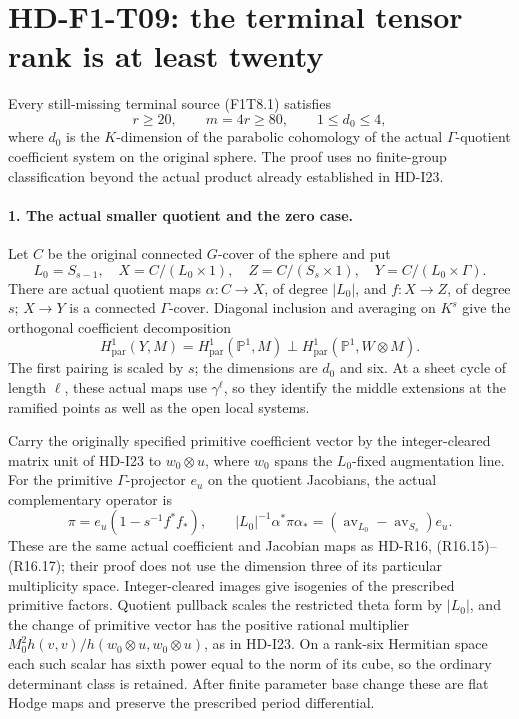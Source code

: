 \section{HD-F1-T09: the terminal tensor rank is at least twenty}
\label{sec:f1-terminal-tensor-budget}

Every still-missing terminal source (F1T8.1) satisfies
\[
                r\ge20,\qquad m=4r\ge80,\qquad
                         1\le d_0\le4,
 \tag{F1T9.1}
\]
where \(d_0\) is the \(K\)-dimension of the parabolic cohomology
of the actual \(\Gamma\)-quotient coefficient system on the
original sphere. The proof uses no finite-group classification
beyond the actual product already established in HD-I23.

\paragraph{1. The actual smaller quotient and the zero case.}
Let \(C\) be the original connected \(G\)-cover of the sphere and
put
\[
 L_0=S_{s-1},\quad X=C/(L_0\times1),\quad Z=C/(S_s\times1),
 \quad Y=C/(L_0\times\Gamma).
 \tag{F1T9.2}
\]
There are actual quotient maps \(\alpha:C\to X\), of degree
\(|L_0|\), and \(f:X\to Z\), of degree \(s\);
\(X\to Y\) is a connected
\(\Gamma\)-cover. Diagonal inclusion and averaging on \(K^s\)
give the orthogonal coefficient decomposition
\[
 H^1_{\mathrm{par}}(Y,M)=
 H^1_{\mathrm{par}}(\mathbb P^1,M)\mathbin{\perp}
 H^1_{\mathrm{par}}(\mathbb P^1,W\otimes M).
 \tag{F1T9.3}
\]
The first pairing is scaled by \(s\); the dimensions are \(d_0\)
and six. At a sheet cycle of length \(\ell\), these actual maps
use \(\gamma^\ell\), so they identify the middle extensions at
the ramified points as well as the open local systems.

Carry the originally specified primitive coefficient vector by
the integer-cleared matrix unit of HD-I23 to \(w_0\otimes u\),
where \(w_0\) spans the \(L_0\)-fixed augmentation line. For the
primitive \(\Gamma\)-projector \(e_u\) on the quotient Jacobians,
the actual complementary operator is
\[
 \pi=e_u(1-s^{-1}f^*f_*),\qquad
 |L_0|^{-1}\alpha^*\pi\alpha_*
       =(\operatorname{av}_{L_0}-\operatorname{av}_{S_s})e_u.
 \tag{F1T9.4}
\]
These are the same actual coefficient and Jacobian maps as
HD-R16, (R16.15)--(R16.17); their proof does not use the
dimension three of its particular multiplicity space.
Integer-cleared images give isogenies of the prescribed
primitive factors. Quotient pullback scales the restricted
theta form by \(|L_0|\), and the change of primitive vector
has the positive rational multiplier
\(M_0^2h(v,v)/h(w_0\otimes u,w_0\otimes u)\), as in HD-I23.
On a rank-six Hermitian space each such scalar has sixth
power equal to the norm of its cube, so the ordinary
determinant class is retained. After finite parameter base
change these are flat Hodge maps and preserve the prescribed
period differential.

